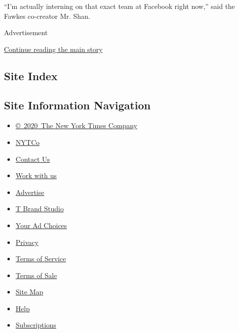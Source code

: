 ``I'm actually interning on that exact team at Facebook right now,''
said the Fawkes co-creator Mr. Shan.

Advertisement

\protect\hyperlink{after-bottom}{Continue reading the main story}

\hypertarget{site-index}{%
\subsection{Site Index}\label{site-index}}

\hypertarget{site-information-navigation}{%
\subsection{Site Information
Navigation}\label{site-information-navigation}}

\begin{itemize}
\tightlist
\item
  \href{https://help.nytimes.com/hc/en-us/articles/115014792127-Copyright-notice}{©~2020~The
  New York Times Company}
\end{itemize}

\begin{itemize}
\tightlist
\item
  \href{https://www.nytco.com/}{NYTCo}
\item
  \href{https://help.nytimes.com/hc/en-us/articles/115015385887-Contact-Us}{Contact
  Us}
\item
  \href{https://www.nytco.com/careers/}{Work with us}
\item
  \href{https://nytmediakit.com/}{Advertise}
\item
  \href{http://www.tbrandstudio.com/}{T Brand Studio}
\item
  \href{https://www.nytimes.com/privacy/cookie-policy\#how-do-i-manage-trackers}{Your
  Ad Choices}
\item
  \href{https://www.nytimes.com/privacy}{Privacy}
\item
  \href{https://help.nytimes.com/hc/en-us/articles/115014893428-Terms-of-service}{Terms
  of Service}
\item
  \href{https://help.nytimes.com/hc/en-us/articles/115014893968-Terms-of-sale}{Terms
  of Sale}
\item
  \href{https://spiderbites.nytimes.com}{Site Map}
\item
  \href{https://help.nytimes.com/hc/en-us}{Help}
\item
  \href{https://www.nytimes.com/subscription?campaignId=37WXW}{Subscriptions}
\end{itemize}
